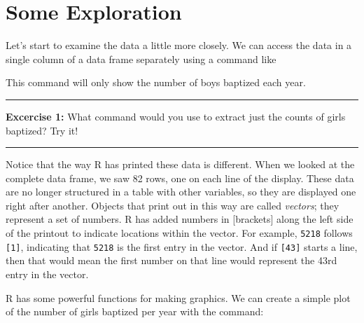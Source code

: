\documentclass[]{book}
\newenvironment{Shaded}{\begin{snugshade}}{\end{snugshade}}
\newcommand{\DataTypeTok}[1]{\textcolor[rgb]{0.13,0.29,0.53}{#1}}
\newcommand{\KeywordTok}[1]{\textcolor[rgb]{0.13,0.29,0.53}{\textbf{#1}}}
\newcommand{\NormalTok}[1]{#1}
\newcommand{\OperatorTok}[1]{\textcolor[rgb]{0.81,0.36,0.00}{\textbf{#1}}}
\theoremstyle{definition}
\theoremstyle{definition}
\theoremstyle{definition}
\theoremstyle{remark}
\begin{document}
\hypertarget{some-exploration}{%
\section{Some Exploration}\label{some-exploration}}

Let's start to examine the data a little more closely. We can access the
data in a single column of a data frame separately using a command like

\begin{Shaded}
\end{Shaded}

This command will only show the number of boys baptized each year.

\begin{center}\rule{0.5\linewidth}{\linethickness}\end{center}

\textbf{Excercise 1:} What command would you use to extract just the
counts of girls baptized? Try it!

\begin{center}\rule{0.5\linewidth}{\linethickness}\end{center}

Notice that the way R has printed these data is different. When we
looked at the complete data frame, we saw 82 rows, one on each line of
the display. These data are no longer structured in a table with other
variables, so they are displayed one right after another. Objects that
print out in this way are called \emph{vectors}; they represent a set of
numbers. R has added numbers in {[}brackets{]} along the left side of
the printout to indicate locations within the vector. For example,
\texttt{5218} follows \texttt{{[}1{]}}, indicating that \texttt{5218} is
the first entry in the vector. And if \texttt{{[}43{]}} starts a line,
then that would mean the first number on that line would represent the
43rd entry in the vector.

R has some powerful functions for making graphics. We can create a
simple plot of the number of girls baptized per year with the command:

\begin{Shaded}
\end{Shaded}
\end{document}
